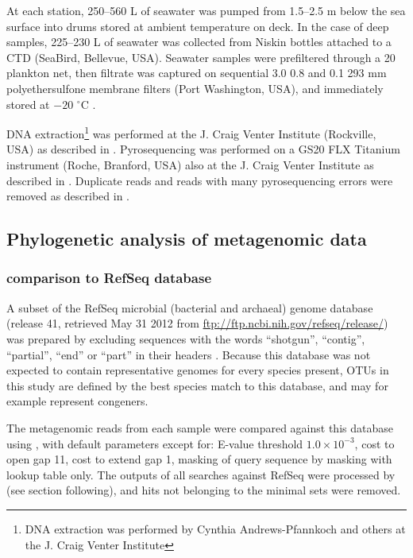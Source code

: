 

At each station, \textapprox{} 250--560 L of seawater was pumped from \textapprox{} 1.5--2.5 m below the sea surface into drums stored at ambient temperature on deck. 
In the case of deep samples, \textapprox{} 225--230 L of seawater was collected from Niskin bottles attached to a \ac{CTD} (SeaBird, Bellevue, USA).
Seawater samples were prefiltered through a 20 \micron{} plankton net, then filtrate was captured on sequential 3.0 \micron{} 0.8 \micron{} and 0.1 \micron{} 293 mm polyethersulfone membrane filters (Port Washington, USA), and immediately stored at $-20$ $^\circ$C \cite{Rusch:2007ez,Ng:2010cd}.

DNA extraction\footnote{DNA extraction was performed by Cynthia Andrews-Pfannkoch and others at the J. Craig Venter Institute} was performed at the J. Craig Venter Institute (Rockville, USA) as described in \citet{Rusch:2007ez}.
Pyrosequencing was performed on a GS20 FLX Titanium instrument (Roche, Branford, USA) also at the J. Craig Venter Institute as described in \citet{Lauro:2010jna}.
Duplicate reads and reads with many pyrosequencing errors were removed as described in \citet{Lauro:2010jna}.

\subsection{Phylogenetic analysis of metagenomic data}

\subsubsection{ comparison to RefSeq database}

A subset of the RefSeq microbial (bacterial and archaeal) genome database (release 41, retrieved May 31 2012 from \url{ftp://ftp.ncbi.nih.gov/refseq/release/}) was prepared by excluding sequences with the words ``shotgun'', ``contig'', ``partial'', ``end'' or ``part'' in their headers \cite{Angly:2009ip}.
Because this database was not expected to contain representative genomes for every species present, \acp{OTU} in this study are defined by the best species match to this database, and may for example represent congeners.

The metagenomic reads from each sample were compared against this database using , with default parameters except for: E-value threshold $1.0\times{}10^{-3}$, cost to open gap 11, cost to extend gap 1, masking of query sequence by  masking with lookup table only.
The outputs of all  searches against RefSeq were processed by  (see section following), and hits not belonging to the minimal sets were removed.

